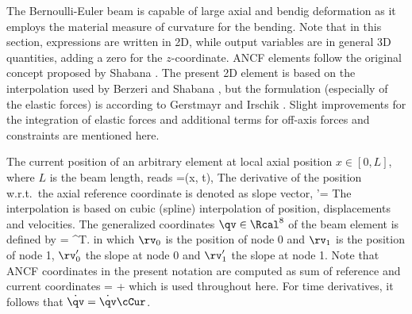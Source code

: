  \noindent
    \finishTable

    The Bernoulli-Euler beam is capable of large axial and bendig deformation as it employs the material measure of curvature for the bending.
    Note that in this section, expressions are written in 2D, while output variables are in general 3D quantities, adding a zero for the $z$-coordinate.
    ANCF elements follow the original concept proposed by Shabana \cite{shabana1997ancf}.
    The present 2D element is based on the interpolation used by Berzeri and Shabana \cite{berzeri2000}, but the formulation (especially of the elastic forces) is according to
    Gerstmayr and Irschik \cite{GerstmayrIrschik2008}.
    Slight improvements for the integration of elastic forces and additional terms for off-axis forces and constraints are mentioned here.
    
    The current position of an arbitrary element at local axial position $x \in [0,L]$, where $L$ is the beam length, reads
    \be
      \rv=\rv(x, t),
    \ee
    The derivative of the position w.r.t.\ the axial reference coordinate is denoted as slope vector,
    \be
      \rv'= 
    \ee
    The interpolation is based on cubic (spline) interpolation of position, displacements and velocities.
    The generalized coordinates $\qv \in \Rcal^8$ of the beam element is defined by
    \be
      \qv= \left[\, \rv_0^{T}\;\;\rv_0^{' T}\;\; \rv_1^{T}\;\; \rv_1^{' T}\, \right]^{T}.
    \ee
    in which $\rv_0$ is the position of node 0 and $\rv_1$ is the position of node 1,
    $\rv'_0$ the slope at node 0 and $\rv'_1$ the slope at node 1.
    Note that ANCF coordinates in the present notation are computed as sum of reference and current coordinates
    \be
      \qv = \qv\cCur + \qv\cRef
    \ee
    which is used throughout here. For time derivatives, it follows that $\dot \qv = \dot \qv\cCur$.
    
